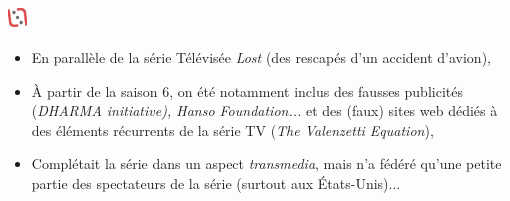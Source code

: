 \documentclass[slidetop,11pt]{beamer}
\def\moreInFrameTitleLeftt{\includegraphics[height=0.5cm]{img/ligueludique-0.png}~~~~~}
\begin{document}
\subsubsection{\sectionPartIIaIII}
\begin{frame}
	\frametitle{\moreInFrameTitleLeftt \sectionPartIIaIII }
	\begin{itemize}
		\item En parall{\`e}le de la s{\'e}rie T{\'e}l{\'e}vis{\'e}e \emph{Lost} (des rescap{\'e}s d'un accident d'avion), 
		\item {\`A} partir de la saison 6, on {\'e}t{\'e} notamment inclus des fausses publicit{\'e}s (\emph{DHARMA initiative), \emph{Hanso Foundation}...} et des (faux) sites web d{\'e}di{\'e}s {\`a} des {\'e}l{\'e}ments r{\'e}currents de la s{\'e}rie TV (\emph{The Valenzetti Equation}), 
		\item Compl{\'e}tait la s{\'e}rie dans un aspect \emph{transmedia}, mais n'a f{\'e}d{\'e}r{\'e} qu'une petite partie des spectateurs de la s{\'e}rie (surtout aux {\'E}tats-Unis)...
	\end{itemize}
\end{frame} 

\def\sectionPartIIaIV{The Lost Ring}
\end{document}
